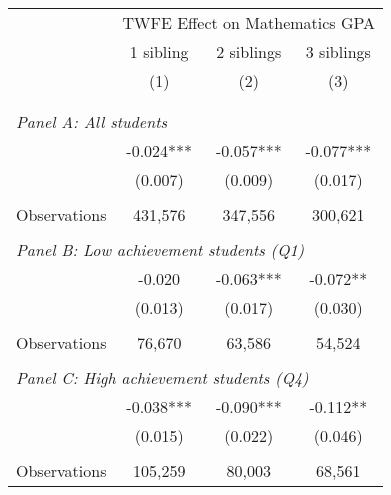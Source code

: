 \makeatletter
{}
{
\makeatother
\begin{tabular}{lccc}
\toprule
\cmidrule(lr){2-4}
& \multicolumn{3}{c}{TWFE Effect on Mathematics GPA} \\
\cmidrule(lr){2-4}
& 1 sibling & 2 siblings & 3 siblings  \\
\cmidrule(lr){2-2} \cmidrule(lr){3-3} \cmidrule(lr){4-4}
& (1) & (2) & (3)\\
\bottomrule
&  &  &  \\
&  &  &   \\
\multicolumn{4}{l}{\textit{Panel A: All students}} \\
\hspace{3mm}        &      -0.024***&      -0.057***&      -0.077***\\
                    &     (0.007)   &     (0.009)   &     (0.017)   \\
                    &               &               &               \\
\hspace{3mm}Observations&     431,576   &     347,556   &     300,621   \\
 
&  &  &   \\
\multicolumn{4}{l}{\textit{Panel B: Low achievement students (Q1)}} \\
\hspace{3mm}        &      -0.020   &      -0.063***&      -0.072** \\
                    &     (0.013)   &     (0.017)   &     (0.030)   \\
                    &               &               &               \\
\hspace{3mm}Observations&      76,670   &      63,586   &      54,524   \\
 
&  &  &   \\
\multicolumn{4}{l}{\textit{Panel C: High achievement students (Q4)}} \\
\hspace{3mm}        &      -0.038***&      -0.090***&      -0.112** \\
                    &     (0.015)   &     (0.022)   &     (0.046)   \\
                    &               &               &               \\
\hspace{3mm}Observations&     105,259   &      80,003   &      68,561   \\
 

\end{tabular}}
